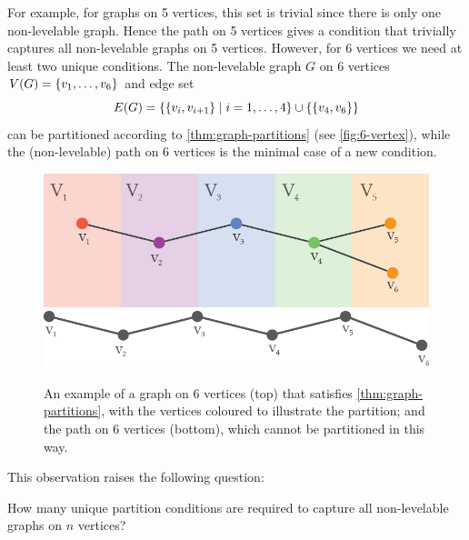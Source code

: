 For example, for graphs on 5 vertices, this set is trivial since there is only one non-levelable graph. Hence the path on 5 vertices gives a condition that trivially captures all non-levelable graphs on 5 vertices. However, for 6 vertices we need at least two unique conditions. The non-levelable graph $G$ on 6 vertices $V(G) = \{ v_1, \dots, v_6 \}$ and edge set 
$$
E(G) = \{ \{ v_i, v_{i+1} \} \; | \; i = 1, \dots, 4 \} \cup \{ \{ v_4, v_6 \} \}
$$
can be partitioned according to \autoref{thm:graph-partitions} (see \autoref{fig:6-vertex}), while the (non-levelable) path on 6 vertices is the minimal case of a new condition. 

\begin{figure}[bth]
    \myfloatalign
    \subfloat
    {\includegraphics[width=.7\linewidth]{figures/6-vertex-1.png}} \\ \vspace{1cm}
    \subfloat
    {\includegraphics[width=.7\linewidth]{figures/6-path.png}} 
    \caption{An example of a graph on 6 vertices (top) that satisfies \autoref{thm:graph-partitions}, with the vertices coloured to illustrate the partition; and the path on 6 vertices (bottom), which cannot be partitioned in this way.} \label{fig:6-vertex}
\end{figure}
\noindent
This observation raises the following question:
\begin{question}
How many unique partition conditions are required to capture all non-levelable graphs on $n$ vertices?
\end{question}



